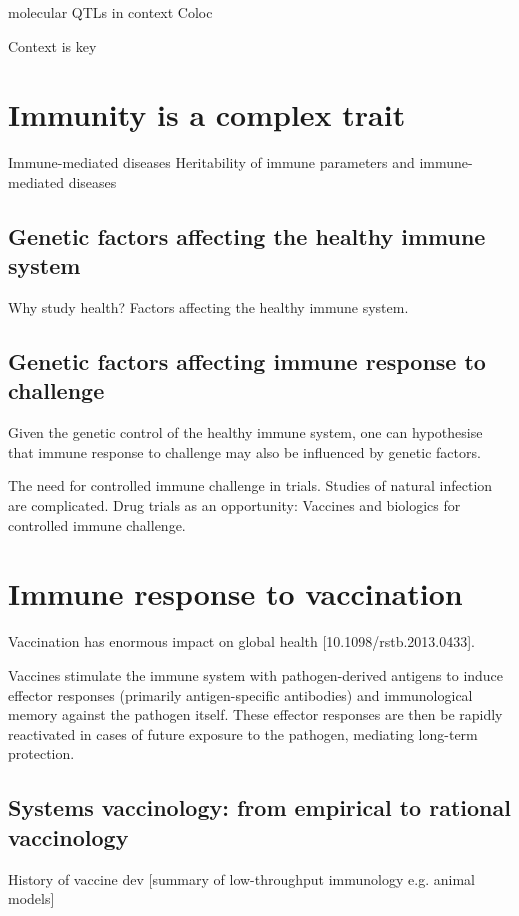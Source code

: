 molecular \glspl{QTL} in context %
Coloc

Context is key

\section{Immunity is a complex trait}
Immune-mediated diseases
Heritability of immune parameters and immune-mediated diseases

\subsection{Genetic factors affecting the healthy immune system}

Why study health?
Factors affecting the healthy immune system.

\subsection{Genetic factors affecting immune response to challenge}

Given the genetic control of the healthy immune system, one can hypothesise that immune response to challenge may also be influenced by genetic factors.

The need for controlled immune challenge in trials.
Studies of natural infection are complicated.
Drug trials as an opportunity: Vaccines and biologics for controlled immune challenge.

\section{Immune response to vaccination}

Vaccination has enormous impact on global health [10.1098/rstb.2013.0433].

Vaccines stimulate the immune system with pathogen-derived antigens to induce effector responses (primarily antigen-specific antibodies) and immunological memory against the pathogen itself.
These effector responses are then be rapidly reactivated in cases of future exposure to the pathogen, mediating long-term protection.

\subsection{Systems vaccinology: from empirical to rational vaccinology}

History of vaccine dev
[summary of low-throughput immunology e.g. animal models]  

